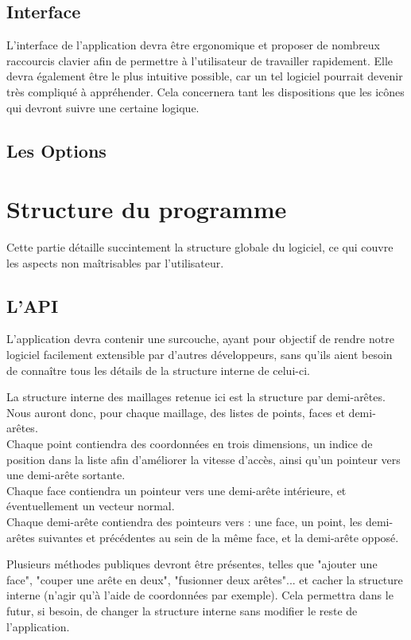\documentclass[a4paper]{memoir}
\begin{document}
			\subsection{Interface}
				L'interface de l'application devra être ergonomique et proposer de nombreux raccourcis clavier afin de permettre à l'utilisateur de 
				travailler rapidement. Elle devra également être le plus intuitive possible, car un tel logiciel pourrait devenir très compliqué à 
				appréhender. Cela concernera tant les dispositions que les icônes qui devront suivre une certaine logique.

			\subsection{Les Options}
	
		\section{Structure du programme}
			Cette partie détaille succintement la structure globale du logiciel, ce qui couvre les aspects non maîtrisables par l'utilisateur.
			
			\subsection{L'API}
				L'application devra contenir une surcouche, ayant pour objectif de rendre notre logiciel facilement extensible par d'autres développeurs, 
				sans qu'ils aient besoin de connaître tous les détails de la structure interne de celui-ci.
				
				La structure interne des maillages retenue ici est la structure par demi-arêtes. Nous auront donc, pour chaque maillage, des listes de 
				points, faces et demi-arêtes.\\ Chaque point contiendra des coordonnées en trois dimensions, un indice de position dans la liste afin 
				d'améliorer la vitesse d'accès, ainsi qu'un pointeur vers une demi-arête sortante.\\ Chaque face contiendra un pointeur vers une demi-arête 
				intérieure, et éventuellement un vecteur normal.\\ Chaque demi-arête contiendra des pointeurs vers : une face, un point, les demi-arêtes 
				suivantes et précédentes au sein de la même face, et la demi-arête opposé.
				
				Plusieurs méthodes publiques devront être présentes, telles que "ajouter une face", "couper une arête en deux", "fusionner deux arêtes"... 
				et cacher la structure interne (n'agir qu'à l'aide de coordonnées par exemple). Cela permettra dans le futur, si besoin, de changer la 
				structure interne sans modifier le reste de l'application.
		
\end{document}
